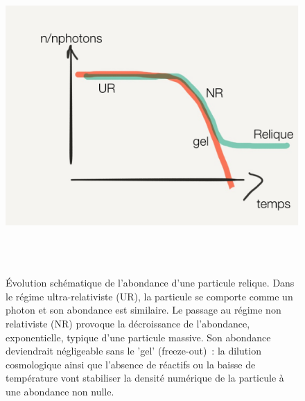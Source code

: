 \begin{figure}[htbp]
	\centering
		\includegraphics[height=12cm]{figs/freeze.png}
	\caption[Évolution schématique de l'abondance d'une particule relique.]{Évolution schématique de l'abondance d'une particule relique. Dans le régime ultra-relativiste (UR), la particule se comporte comme un photon et son abondance est similaire. Le passage au régime non relativiste (NR) provoque la décroissance de l'abondance, exponentielle, typique d'une particule massive. Son abondance deviendrait négligeable sans le 'gel' (freeze-out)~: la dilution cosmologique ainsi que l'absence de réactifs ou la baisse de température vont stabiliser la densité numérique de la particule à une abondance non nulle. }
	\label{f:freeze}
\end{figure}
 
